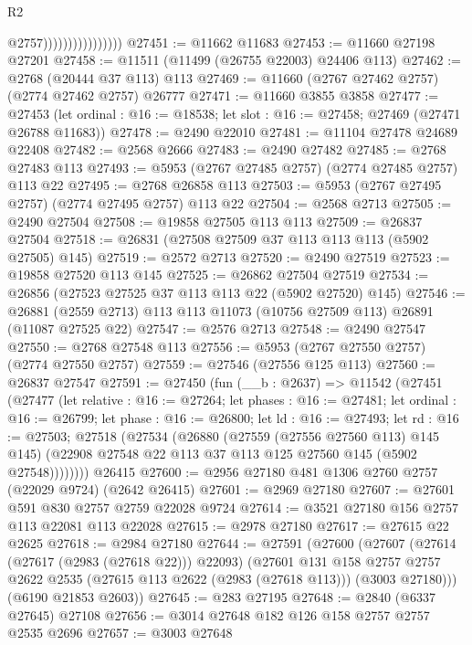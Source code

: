 \begin{lexlean}{R2}
\begin{coremodule}
                                    @2757))))))))))))))))
@27451 := @11662 @11683
@27453 := @11660 @27198 @27201
@27458 := @11511 (@11499 (@26755 @22003) @24406 @113)
@27462 := @2768 (@20444 @37 @113) @113
@27469 := @11660 (@2767 @27462 @2757) (@2774 @27462 @2757) @26777
@27471 := @11660 @3855 @3858
@27477 := @27453
    (let ordinal : @16 := @18538; let slot : @16 := @27458; @27469 (@27471 @26788 @11683))
@27478 := @2490 @22010
@27481 := @11104 @27478 @24689 @22408
@27482 := @2568 @2666
@27483 := @2490 @27482
@27485 := @2768 @27483 @113
@27493 := @5953 (@2767 @27485 @2757) (@2774 @27485 @2757) @113 @22
@27495 := @2768 @26858 @113
@27503 := @5953 (@2767 @27495 @2757) (@2774 @27495 @2757) @113 @22
@27504 := @2568 @2713
@27505 := @2490 @27504
@27508 := @19858 @27505 @113 @113
@27509 := @26837 @27504
@27518 := @26831 (@27508 @27509 @37 @113 @113 @113 (@5902 @27505) @145)
@27519 := @2572 @2713
@27520 := @2490 @27519
@27523 := @19858 @27520 @113 @145
@27525 := @26862 @27504 @27519
@27534 := @26856 (@27523 @27525 @37 @113 @113 @22 (@5902 @27520) @145)
@27546 := @26881 (@2559 @2713) @113 @113 @11073 (@10756 @27509 @113) @26891 (@11087 @27525 @22)
@27547 := @2576 @2713
@27548 := @2490 @27547
@27550 := @2768 @27548 @113
@27556 := @5953 (@2767 @27550 @2757) (@2774 @27550 @2757)
@27559 := @27546 (@27556 @125 @113)
@27560 := @26837 @27547
@27591 := @27450
    (fun (__b : @2637) =>
    @11542
      (@27451
        (@27477
          (let relative : @16 := @27264;
          let phases : @16 := @27481;
          let ordinal : @16 := @26799;
          let phase : @16 := @26800;
          let ld : @16 := @27493;
          let rd : @16 := @27503;
          @27518
            (@27534
              (@26880
                (@27559 (@27556 @27560 @113) @145 @145)
                (@22908 @27548 @22 @113 @37 @113 @125 @27560 @145 (@5902 @27548))))))))
    @26415
@27600 := @2956 @27180 @481 @1306 @2760 @2757 (@22029 @9724) (@2642 @26415)
@27601 := @2969 @27180
@27607 := @27601 @591 @830 @2757 @2759 @22028 @9724
@27614 := @3521 @27180 @156 @2757 @113 @22081 @113 @22028
@27615 := @2978 @27180
@27617 := @27615 @22 @2625
@27618 := @2984 @27180
@27644 := @27591
    (@27600
      (@27607
        (@27614 (@27617 (@2983 (@27618 @22))) @22093)
        (@27601
          @131
          @158
          @2757
          @2757
          @2622
          @2535
          (@27615 @113 @2622 (@2983 (@27618 @113)))
          (@3003 @27180)))
      (@6190 @21853 @2603))
@27645 := @283 @27195
@27648 := @2840 (@6337 @27645) @27108
@27656 := @3014 @27648 @182 @126 @158 @2757 @2757 @2535 @2696
@27657 := @3003 @27648

\end{coremodule}
\end{lexlean}
